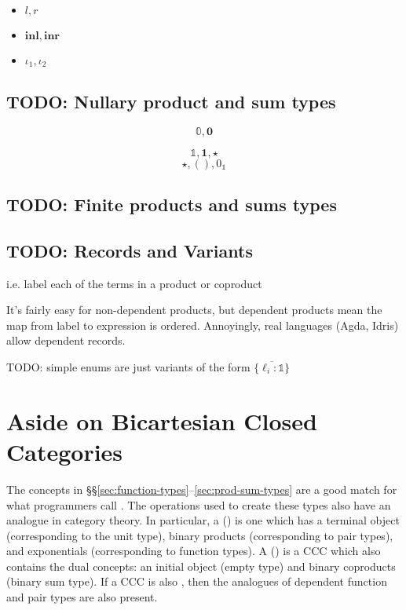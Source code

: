 \documentclass[11pt]{article} %
\theoremstyle{definition}
\theoremstyle{remark}
\begin{document}
\begin{itemize}
  \item $l, r$
  \item $\mathbf{inl}, \mathbf{inr}$
  \item $\iota_1, \iota_2$
\end{itemize}


\subsection{TODO: Nullary product and sum types}

$$\mathbb 0, \mathbf 0$$

$$\mathbb 1, \mathbf 1, \star$$
$$\star, (), 0_\mathbb 1$$

\subsection{TODO: Finite products and sums types}

\subsection{TODO: Records and Variants}
i.e. label each of the terms in a product or coproduct

It's fairly easy for non-dependent products, but dependent products mean the map from label to expression is ordered.
Annoyingly, real languages (Agda, Idris) allow dependent records.

TODO: simple enums are just variants of the form $\{\overline{\ell_i\colon \mathbb 1}\}$

\section*{Aside on Bicartesian Closed Categories}

The concepts in \S\S\ref{sec:function-types}--\ref{sec:prod-sum-types} are a good match for what programmers call .
The operations used to create these types also have an analogue in category theory.
In particular, a  () is one which has a terminal object (corresponding to the unit type), binary products (corresponding to pair types), and exponentials (corresponding to function types).
A  () is a CCC which also contains the dual concepts: an initial object (empty type) and binary coproducts (binary sum type).
If a CCC is also , then the analogues of dependent function and pair types are also present.
\end{document}
